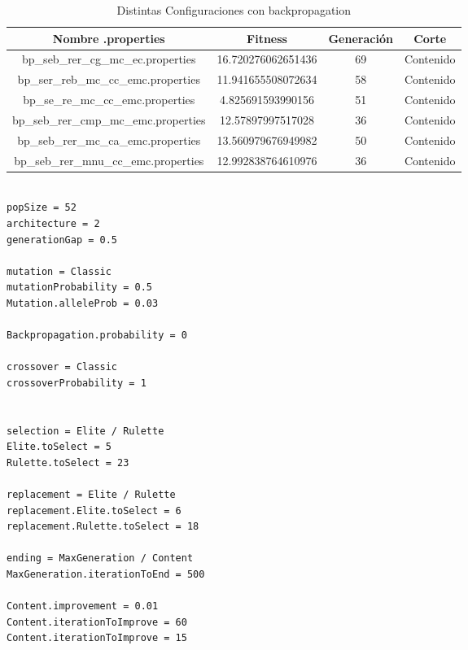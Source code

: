 \documentclass{sig-alternate}
\begin{document}
\begin{table}[htp]
	\begin{center}
	\begin{tabular}{|c|c|c|c|}
		\hline
	     Nombre .properties & Fitness & Generación & Corte \\
		\hline
		bp\_seb\_rer\_cg\_mc\_ec.properties 		& 16.720276062651436 	& 69 & Contenido \\
		bp\_ser\_reb\_mc\_cc\_emc.properties 	& 11.941655508072634 	& 58 & Contenido \\
		bp\_se\_re\_mc\_cc\_emc.properties 		& 4.825691593990156 	& 51 & Contenido \\
		bp\_seb\_rer\_cmp\_mc\_emc.properties 	& 12.57897997517028 	& 36 & Contenido \\
		bp\_seb\_rer\_mc\_ca\_emc.properties 	& 13.560979676949982 	& 50 & Contenido \\
		bp\_seb\_rer\_mnu\_cc\_emc.properties 	& 12.992838764610976 	& 36 & Contenido \\
		\hline
	\end{tabular}
	\caption{Distintas Configuraciones con backpropagation}
	\label{table:backpropagation}
	\end{center}
\end{table}

\newpage

\begin{lstlisting}[caption={Archivo de configuración simple},label={code:simple}]

popSize = 52
architecture = 2
generationGap = 0.5

mutation = Classic
mutationProbability = 0.5
Mutation.alleleProb = 0.03

Backpropagation.probability = 0

crossover = Classic
crossoverProbability = 1


selection = Elite / Rulette
Elite.toSelect = 5
Rulette.toSelect = 23

replacement = Elite / Rulette
replacement.Elite.toSelect = 6
replacement.Rulette.toSelect = 18

ending = MaxGeneration / Content
MaxGeneration.iterationToEnd = 500

Content.improvement = 0.01
Content.iterationToImprove = 60
Content.iterationToImprove = 15

\end{lstlisting}
\end{document}
